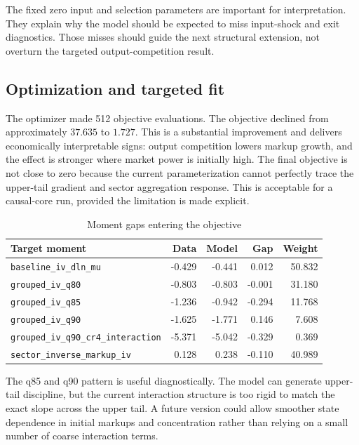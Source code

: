 \documentclass[11pt,a4paper]{article}
\begin{document}
The fixed zero input and selection parameters are important for interpretation. They explain why the model should be expected to miss input-shock and exit diagnostics. Those misses should guide the next structural extension, not overturn the targeted output-competition result.

\subsection{Optimization and targeted fit}

The optimizer made 512 objective evaluations. The objective declined from approximately \(37.635\) to \(1.727\). This is a substantial improvement and delivers economically interpretable signs: output competition lowers markup growth, and the effect is stronger where market power is initially high. The final objective is not close to zero because the current parameterization cannot perfectly trace the upper-tail gradient and sector aggregation response. This is acceptable for a causal-core run, provided the limitation is made explicit.

\begin{table}[H]
\centering
\caption{Moment gaps entering the objective}
\small
\begin{tabular}{lrrrr}
\toprule
Target moment & Data & Model & Gap & Weight \\
\midrule
\texttt{baseline\_iv\_dln\_mu} & -0.429 & -0.441 & 0.012 & 50.832 \\
\texttt{grouped\_iv\_q80} & -0.803 & -0.803 & -0.001 & 31.180 \\
\texttt{grouped\_iv\_q85} & -1.236 & -0.942 & -0.294 & 11.768 \\
\texttt{grouped\_iv\_q90} & -1.625 & -1.771 & 0.146 & 7.608 \\
\texttt{grouped\_iv\_q90\_cr4\_interaction} & -5.371 & -5.042 & -0.329 & 0.369 \\
\texttt{sector\_inverse\_markup\_iv} & 0.128 & 0.238 & -0.110 & 40.989 \\
\bottomrule
\end{tabular}
\end{table}

The q85 and q90 pattern is useful diagnostically. The model can generate upper-tail discipline, but the current interaction structure is too rigid to match the exact slope across the upper tail. A future version could allow smoother state dependence in initial markups and concentration rather than relying on a small number of coarse interaction terms.
\end{document}
